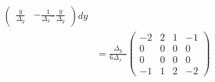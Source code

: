 \documentclass{mc2013}
\newcommand\bs{\boldsymbol}
\newcommand\tf{\varphi}
\renewcommand{\(}{\left(}
\renewcommand{\)}{\right)}
\renewcommand{\[}{\left[}
\renewcommand{\]}{\right]}
\begin{document}
\begin{itemize}
\begin{equation}
\begin{split}
\begin{pmatrix}
\frac{y}{{\Delta _y}} & -\frac{1}{{\Delta _x}^-}\frac{y}{{\Delta _y}}
\end{pmatrix}
dy\\
&= \frac{{\Delta _y}}{6{\Delta _x}^-}
\begin{pmatrix}
-2 & 2 & 1 & -1 \\
0 & 0 & 0 & 0 \\
0 & 0 & 0 & 0 \\
-1 & 1 & 2 & -2
\end{pmatrix}
\end{split}
\end{equation}
%

\end{itemize}
\end{document}

